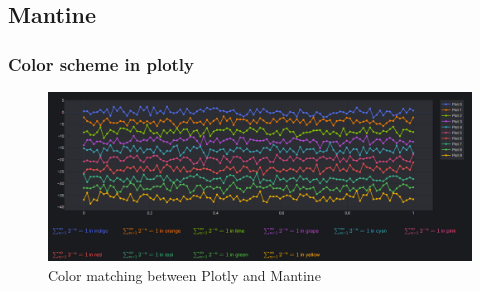 \subsection{Mantine}
\subsubsection{Color scheme in plotly}
\begin{figure}
    \centering
    \includegraphics[width=\textwidth]{figures/gui/colors.png}
    \caption{Color matching between Plotly and Mantine}
    \label{fig:color_matching}
\end{figure}